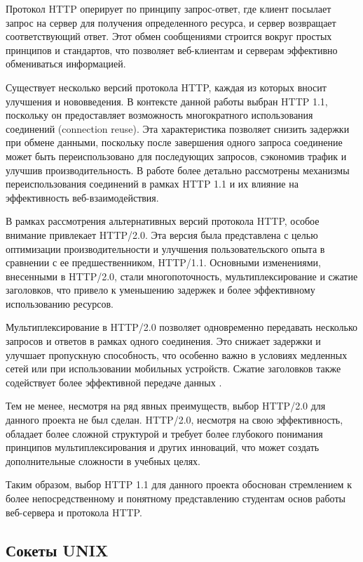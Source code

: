 Протокол HTTP оперирует по принципу запрос-ответ, где клиент посылает запрос на сервер для получения определенного ресурса, и сервер возвращает соответствующий ответ. Этот обмен сообщениями строится вокруг простых принципов и стандартов, что позволяет веб-клиентам и серверам эффективно обмениваться информацией.

Существует несколько версий протокола HTTP, каждая из которых вносит улучшения и нововведения. В контексте данной работы выбран HTTP 1.1, поскольку он предоставляет возможность многократного использования соединений (connection reuse). Эта характеристика позволяет снизить задержки при обмене данными, поскольку после завершения одного запроса соединение может быть переиспользовано для последующих запросов, сэкономив трафик и улучшив производительность. В работе более детально рассмотрены механизмы переиспользования соединений в рамках HTTP 1.1 и их влияние на эффективность веб-взаимодействия.

В рамках рассмотрения альтернативных версий протокола HTTP, особое внимание привлекает HTTP/2.0. Эта версия была представлена с целью оптимизации производительности и улучшения пользовательского опыта в сравнении с ее предшественником, HTTP/1.1. Основными изменениями, внесенными в HTTP/2.0, стали многопоточность, мультиплексирование и сжатие заголовков, что привело к уменьшению задержек и более эффективному использованию ресурсов.

Мультиплексирование в HTTP/2.0 позволяет одновременно передавать несколько запросов и ответов в рамках одного соединения. Это снижает задержки и улучшает пропускную способность, что особенно важно в условиях медленных сетей или при использовании мобильных устройств. Сжатие заголовков также содействует более эффективной передаче данных \cite{nets2}.

Тем не менее, несмотря на ряд явных преимуществ, выбор HTTP/2.0 для данного проекта не был сделан. HTTP/2.0, несмотря на свою эффективность, обладает более сложной структурой и требует более глубокого понимания принципов мультиплексирования и других инноваций, что может создать дополнительные сложности в учебных целях. 

Таким образом, выбор HTTP 1.1 для данного проекта обоснован стремлением к более непосредственному и понятному представлению студентам основ работы веб-сервера и протокола HTTP.

\subsection{Сокеты UNIX}

